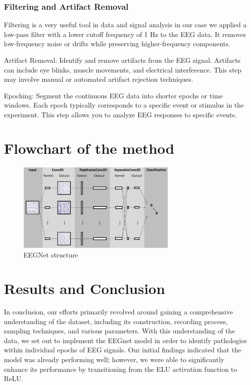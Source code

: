 \documentclass{article}
\begin{document}
\subsubsection{Filtering and Artifact Removal}
Filtering is a very useful tool in data and signal analysis in our case we applied a low-pass filter with a lower cutoff frequency of 1 Hz to the EEG data. It removes low-frequency noise or drifts while preserving higher-frequency components.

Artifact Removal: Identify and remove artifacts from the EEG signal. Artifacts can include eye blinks, muscle movements, and electrical interference. This step may involve manual or automated artifact rejection techniques.

Epoching: Segment the continuous EEG data into shorter epochs or time windows. Each epoch typically corresponds to a specific event or stimulus in the experiment. This step allows you to analyze EEG responses to specific events.


\section{Flowchart of the method}

\begin{figure}[h]
  \centering
  \includegraphics[width=0.7\textwidth]{img/EEGNet.jpg}
  \caption{EEGNet structure \cite{EEGNet}}
  \label{fig:EEGNet}
\end{figure}



\section{Results and Conclusion}


In conclusion, our efforts primarily revolved around gaining a comprehensive understanding of the dataset, including its construction, recording process, sampling techniques, and various parameters. With this understanding of the data, we set out to implement the EEGnet model in order to identify pathologies within individual epochs of EEG signals. Our initial findings indicated that the model was already performing well; however, we were able to significantly enhance its performance by transitioning from the ELU activation function to ReLU.
\end{document}
